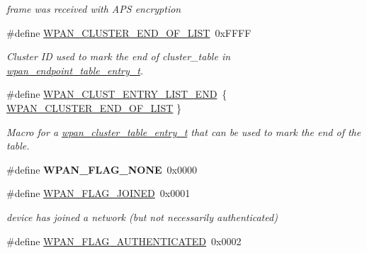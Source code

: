 \begin{DoxyCompactItemize}
\begin{DoxyCompactList}\small\item\em frame was received with A\-P\-S encryption \end{DoxyCompactList}\item 
\#define \hyperlink{group__wpan__aps_gacbfdff1cef70167f178c4e05b69f65fe}{W\-P\-A\-N\-\_\-\-C\-L\-U\-S\-T\-E\-R\-\_\-\-E\-N\-D\-\_\-\-O\-F\-\_\-\-L\-I\-S\-T}~0x\-F\-F\-F\-F
\begin{DoxyCompactList}\small\item\em Cluster I\-D used to mark the end of {\ttfamily cluster\-\_\-table} in \hyperlink{structwpan__endpoint__table__entry__t}{wpan\-\_\-endpoint\-\_\-table\-\_\-entry\-\_\-t}. \end{DoxyCompactList}\item 
\#define \hyperlink{group__wpan__aps_ga55a7fbd8adf019d268f17b6ede90fe0f}{W\-P\-A\-N\-\_\-\-C\-L\-U\-S\-T\-\_\-\-E\-N\-T\-R\-Y\-\_\-\-L\-I\-S\-T\-\_\-\-E\-N\-D}~\{ \hyperlink{group__wpan__aps_gacbfdff1cef70167f178c4e05b69f65fe}{W\-P\-A\-N\-\_\-\-C\-L\-U\-S\-T\-E\-R\-\_\-\-E\-N\-D\-\_\-\-O\-F\-\_\-\-L\-I\-S\-T} \}
\begin{DoxyCompactList}\small\item\em Macro for a \hyperlink{structwpan__cluster__table__entry__t}{wpan\-\_\-cluster\-\_\-table\-\_\-entry\-\_\-t} that can be used to mark the end of the table. \end{DoxyCompactList}\item 
\hypertarget{group__wpan__aps_ga550a679be9209ba69cdc3d6a0846b86d}{\#define {\bfseries W\-P\-A\-N\-\_\-\-F\-L\-A\-G\-\_\-\-N\-O\-N\-E}~0x0000}\label{group__wpan__aps_ga550a679be9209ba69cdc3d6a0846b86d}

\item 
\hypertarget{group__wpan__aps_gaa06c0d38b4a130f9657abf26c73b49dd}{\#define \hyperlink{group__wpan__aps_gaa06c0d38b4a130f9657abf26c73b49dd}{W\-P\-A\-N\-\_\-\-F\-L\-A\-G\-\_\-\-J\-O\-I\-N\-E\-D}~0x0001}\label{group__wpan__aps_gaa06c0d38b4a130f9657abf26c73b49dd}

\begin{DoxyCompactList}\small\item\em device has joined a network (but not necessarily authenticated) \end{DoxyCompactList}\item 
\hypertarget{group__wpan__aps_ga6508b417838fc0a043f5570b65e3f24b}{\#define \hyperlink{group__wpan__aps_ga6508b417838fc0a043f5570b65e3f24b}{W\-P\-A\-N\-\_\-\-F\-L\-A\-G\-\_\-\-A\-U\-T\-H\-E\-N\-T\-I\-C\-A\-T\-E\-D}~0x0002}\label{group__wpan__aps_ga6508b417838fc0a043f5570b65e3f24b}


\end{DoxyCompactItemize}

